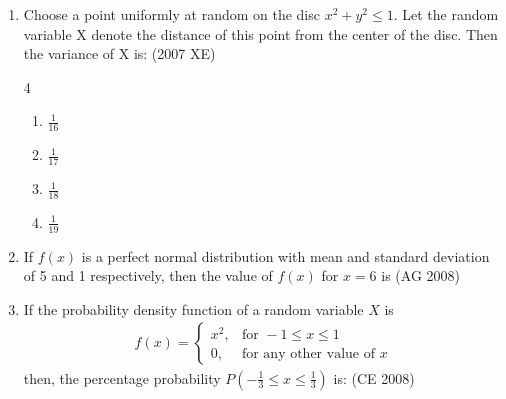 \begin{enumerate}[label=\thesubsection.\arabic*,ref=\thesubsection.\theenumi]
\begin{multicols}{4}
\begin{enumerate}
        \item $\frac{6}{32}$
        \item $\frac{7}{32}$
        \item $\frac{1}{4}$
        \item $\frac{3}{4}$
    \end{enumerate}
    \end{multicols}
    \item Choose a point uniformly at random on the disc $x^2 + y^2 \leq 1$. Let the random variable X denote the distance of this point from the center of the disc. Then the variance of X is:
    \hfill{(2007 XE)}
    \begin{multicols}{4}
    \begin{enumerate}
        \item $\frac{1}{16}$
        \item $\frac{1}{17}$
        \item $\frac{1}{18}$
        \item $\frac{1}{19}$
    \end{enumerate}
\end{multicols}
\item 
 If $f(x)$ is a perfect normal distribution with mean and standard deviation of 5 and 1 respectively, then the value of $f(x)$ for $x = 6$ is
\hfill(AG 2008)
\begin{enumerate}
\end{enumerate}
\item If the probability density function of a random variable $X$ is  
\begin{align*}
f(x) = 
\begin{cases}
x^2, & \text{for } -1 \leq x \leq 1 \\
0, & \text{for any other value of } x
\end{cases}
\end{align*}
then, the percentage probability $P\left( -\frac{1}{3} \leq x \leq \frac{1}{3} \right)$ is: \hfill (CE 2008)
\begin{enumerate}
\end{enumerate}
\end{enumerate}
